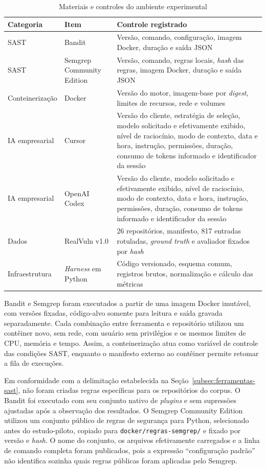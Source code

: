 \begin{table}[htb]
\ABNTEXfontereduzida
\caption{\label{tab:ambiente-experimental}Materiais e controles do ambiente experimental}
\centering
\begin{tabularx}{\textwidth}{|l|X|X|}
\hline
\textbf{Categoria} & \textbf{Item} & \textbf{Controle registrado} \\
\hline
SAST & Bandit & Versão, comando, configuração, imagem Docker, duração e saída JSON \\
\hline
SAST & Semgrep Community Edition & Versão, comando, regras locais, \textit{hash} das regras, imagem Docker, duração e saída JSON \\
\hline
Conteinerização & Docker & Versão do motor, imagem-base por \textit{digest}, limites de recursos, rede e volumes \\
\hline
IA empresarial & Cursor & Versão do cliente, estratégia de seleção, modelo solicitado e efetivamente exibido, nível de raciocínio, modo de contexto, data e hora, instrução, permissões, duração, consumo de tokens informado e identificador da sessão \\
\hline
IA empresarial & OpenAI Codex & Versão do cliente, modelo solicitado e efetivamente exibido, nível de raciocínio, modo de contexto, data e hora, instrução, permissões, duração, consumo de tokens informado e identificador da sessão \\
\hline
Dados & RealVuln v1.0 & 26 repositórios, manifesto, 817 entradas rotuladas, \textit{ground truth} e avaliador fixados por \textit{hash} \\
\hline
Infraestrutura & \textit{Harness} em Python & Código versionado, esquema comum, registros brutos, normalização e cálculo das métricas \\
\hline
\end{tabularx}
\end{table}

Bandit e Semgrep foram executados a partir de uma imagem Docker imutável, com versões fixadas, código-alvo somente para leitura e saída gravada separadamente. Cada combinação entre ferramenta e repositório utilizou um contêiner novo, sem rede, com usuário sem privilégios e os mesmos limites de CPU, memória e tempo. Assim, a conteinerização atua como variável de controle das condições SAST, enquanto o manifesto externo ao contêiner permite retomar a fila de execuções.

Em conformidade com a delimitação estabelecida na Seção~\ref{subsec:ferramentas-sast}, não foram criadas regras específicas para os repositórios do corpus. O Bandit foi executado com seu conjunto nativo de \textit{plugins} e sem supressões ajustadas após a observação dos resultados. O Semgrep Community Edition utilizou um conjunto público de regras de segurança para Python, selecionado antes do estudo-piloto, copiado para \texttt{docker/regras-semgrep/} e fixado por versão e \textit{hash}. O nome do conjunto, os arquivos efetivamente carregados e a linha de comando completa foram publicados, pois a expressão ``configuração padrão'' não identifica sozinha quais regras públicas foram aplicadas pelo Semgrep.

